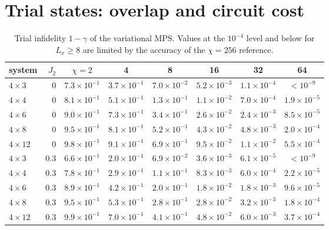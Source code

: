 \documentclass[10pt]{article}
\begin{document}
\section{Trial states: overlap and circuit cost}

\begin{table}[h]
\centering\small
\caption{Trial infidelity $1-\gamma$ of the variational MPS. Values at the $10^{-4}$ level and below for
$L_x\ge8$ are limited by the accuracy of the $\chi=256$ reference.}
\begin{tabular}{lrcccccc}
\toprule
system & $J_2$ & $\chi=2$ & 4 & 8 & 16 & 32 & 64 \\
\midrule
$4\times3$ & 0 & $7.3\times10^{-1}$ & $3.7\times10^{-1}$ & $7.0\times10^{-2}$ & $5.2\times10^{-3}$ & $1.1\times10^{-4}$ & $<10^{-9}$ \\
$4\times4$ & 0 & $8.1\times10^{-1}$ & $5.1\times10^{-1}$ & $1.3\times10^{-1}$ & $1.1\times10^{-2}$ & $7.0\times10^{-4}$ & $1.9\times10^{-5}$ \\
$4\times6$ & 0 & $9.0\times10^{-1}$ & $7.3\times10^{-1}$ & $3.4\times10^{-1}$ & $2.6\times10^{-2}$ & $2.4\times10^{-3}$ & $8.5\times10^{-5}$ \\
$4\times8$ & 0 & $9.5\times10^{-1}$ & $8.1\times10^{-1}$ & $5.2\times10^{-1}$ & $4.3\times10^{-2}$ & $4.8\times10^{-3}$ & $2.0\times10^{-4}$ \\
$4\times12$ & 0 & $9.8\times10^{-1}$ & $9.1\times10^{-1}$ & $6.9\times10^{-1}$ & $9.5\times10^{-2}$ & $1.1\times10^{-2}$ & $5.5\times10^{-4}$ \\
$4\times3$ & 0.3 & $6.6\times10^{-1}$ & $2.0\times10^{-1}$ & $6.9\times10^{-2}$ & $3.6\times10^{-3}$ & $6.1\times10^{-5}$ & $<10^{-9}$ \\
$4\times4$ & 0.3 & $7.8\times10^{-1}$ & $2.9\times10^{-1}$ & $1.1\times10^{-1}$ & $8.3\times10^{-3}$ & $6.0\times10^{-4}$ & $2.2\times10^{-5}$ \\
$4\times6$ & 0.3 & $8.9\times10^{-1}$ & $4.2\times10^{-1}$ & $2.0\times10^{-1}$ & $1.8\times10^{-2}$ & $1.8\times10^{-3}$ & $9.6\times10^{-5}$ \\
$4\times8$ & 0.3 & $9.5\times10^{-1}$ & $5.3\times10^{-1}$ & $2.8\times10^{-1}$ & $2.8\times10^{-2}$ & $3.2\times10^{-3}$ & $1.8\times10^{-4}$ \\
$4\times12$ & 0.3 & $9.9\times10^{-1}$ & $7.0\times10^{-1}$ & $4.1\times10^{-1}$ & $4.8\times10^{-2}$ & $6.0\times10^{-3}$ & $3.7\times10^{-4}$ \\
\bottomrule
\end{tabular}
\end{table}
\end{document}
